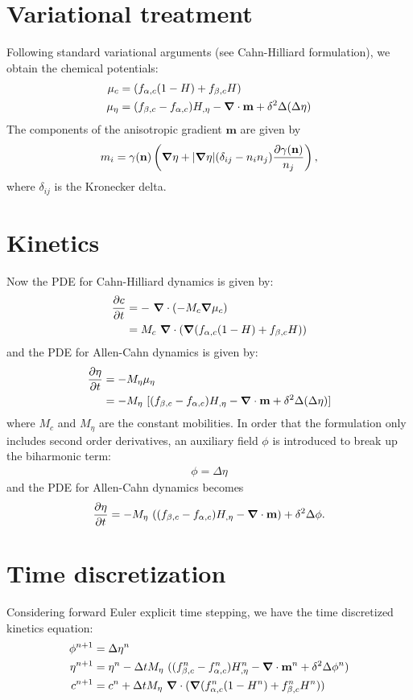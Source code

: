 \documentclass[10pt]{article}
\newcommand{\gv}[1]{\ensuremath{\mbox{\boldmath$ #1 $}}}
\newcommand{\grad}[1]{\gv{\nabla} #1}
\begin{document}
\section{Variational treatment}
Following standard variational arguments (see Cahn-Hilliard formulation), we obtain the chemical potentials:
\begin{align}
  \mu_{c}  &= (f_{\alpha,c}(1-H)+f_{\beta,c}H)  \\
  \mu_{\eta}  &= (f_{\beta,c}-f_{\alpha,c})H_{,\eta} - \grad \cdot \mathbf{m} + \delta^2 \Delta(\Delta \eta)
\end{align}
The components of the anisotropic gradient $\mathbf{m}$ are given by
\begin{equation}
m_i = \gamma(\mathbf{n}) \left( \grad \eta + |\grad \eta| (\delta_{ij}-n_i n_j) \frac{\partial \gamma (\mathbf{n})}{n_j} \right),
\end{equation}
where $\delta_{ij}$ is the Kronecker delta.

\section{Kinetics}
Now the PDE for Cahn-Hilliard dynamics is given by:
\begin{align}
  \frac{\partial c}{\partial t} &= -~\grad \cdot (-M_c\grad \mu_c)\\
  &=M_c~\grad \cdot (\grad (f_{\alpha,c}(1-H)+f_{\beta,c}H)) 
  \end{align}
  and the PDE for Allen-Cahn dynamics is given by:
  \begin{align}
    \frac{\partial \eta}{\partial t} &= -M_\eta \mu_\eta \\
  &=-M_\eta ~ [(f_{\beta,c}-f_{\alpha,c})H_{,\eta} - \grad \cdot \mathbf{m} + \delta^2 \Delta(\Delta \eta)]
\end{align}
where $M_c$ and $M_\eta$ are the constant mobilities.  In order that the formulation only includes second order derivatives, an auxiliary field $\phi$ is introduced to break up the biharmonic term:
\begin{align}
\phi = \Delta \eta
\end{align}
and the PDE for Allen-Cahn dynamics becomes 
\begin{align}
    \frac{\partial \eta}{\partial t} =-M_\eta ~ ((f_{\beta,c}-f_{\alpha,c})H_{,\eta} - \grad \cdot \mathbf{m}) + \delta^2 \Delta \phi .
\end{align}

\section{Time discretization}
Considering forward Euler explicit time stepping, we have the time discretized kinetics equation:
\begin{align}
 \phi^{n+1} &= \Delta \eta^n \\
 \eta^{n+1} &= \eta^{n}  - \Delta t M_{\eta}~ ((f_{\beta,c}^n-f_{\alpha,c}^n)H_{,\eta}^n -  \grad \cdot \mathbf{m}^n + \delta^2 \Delta \phi^n) \\
c^{n+1} &= c^{n}  + \Delta t M_{\eta}~\grad \cdot (\grad (f_{\alpha,c}^n(1-H^{n})+f_{\beta,c}^n H^{n}))
\end{align}
\end{document}
